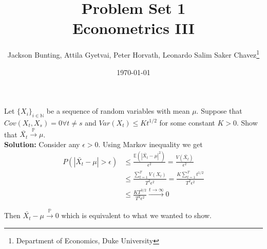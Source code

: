 \documentclass[11pt,letterpaper]{article}                  %
\title{Problem Set 1 \\ \medskip \Large{Econometrics III}}
\author{\Large Jackson Bunting, Attila Gyetvai, Peter Horvath, Leonardo Salim Saker Chavez\footnote{Department of Economics, Duke University}}
\date{\today}
\begin{document}
\maketitle

\begin{problem}

\end{problem}

\bigskip

\begin{problem}

\end{problem}

\bigskip

\begin{problem}
Let $\{X_i\}_{i \in \mathbb{N}}$ be a sequence of random variables with mean $\mu$. Suppose that $Cov(X_t,X_s)=0 \forall t\neq s$ and $Var(X_t) \leq Kt^{1/2}$ for some constant $K>0$. Show that $\bar{X_t} \overset{\mathbb{P}}{\rightarrow} \mu$.\\

\textbf{Solution:} Consider any $\epsilon>0$. Using Markov inequality we get
\begin{align*}
P(|\bar{X_t} - \mu| > \epsilon) &\leq \frac{\mathbb{E}( |\bar{X_t} - \mu|^2)}{\epsilon^2} = \frac{V(\bar{X_t})}{\epsilon^2} \\
&\leq \frac{\sum_{t=1}^T V(X_t)}{T^2 \epsilon^2} = \frac{K \sum_{t=1}^T t^{1/2}}{T^2 \epsilon^2} \\
&\leq \frac{K T^{3/2}}{T^2 \epsilon^2} \overset{t \to \infty}{\longrightarrow} 0
\end{align*}

Then $\bar{X_t} - \mu \overset{\mathbb{P}}{\rightarrow} 0$ which is equivalent to what we wanted to show.
\end{problem}

\bigskip

\begin{problem}

\end{problem}

\bigskip
\end{document}
